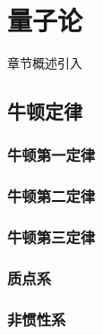 \chapter{量子论}\label{29}

章节概述引入

\section{牛顿定律}\label{3-1}

\subsection{牛顿第一定律}\label{3-1-1}

\subsection{牛顿第二定律}\label{3-1-2}

\subsection{牛顿第三定律}\label{3-1-3}

\subsection{质点系}\label{3-1-4}

\subsection{非惯性系}\label{3-1-5}